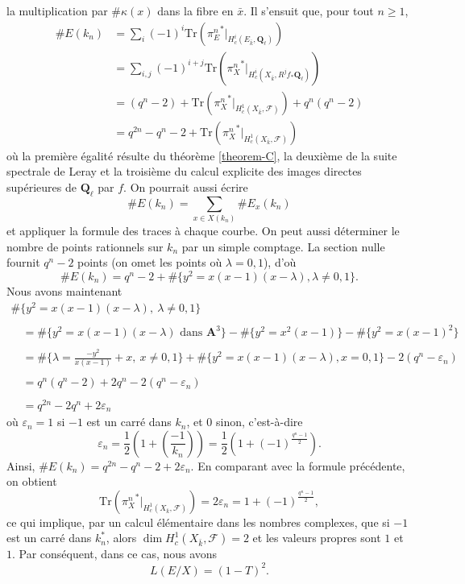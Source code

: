 la multiplication par $\#\kappa(x)$ dans la fibre en $\bar x$. Il s'ensuit que,
pour tout $n\geq 1$,
\begin{align*}
\# E(k_n)
& =
\sum\nolimits_i (-1)^i
\text{Tr}({\pi_E^n}^* |_{H_c^i(E_{\bar k}, \mathbf{Q}_\ell)}) \\
& =
\sum\nolimits_{i, j} (-1)^{i+j}
\text{Tr}({\pi^n_X}^* |_{H_c^i(X_{\bar k}, R^jf_*\mathbf{Q}_\ell)}) \\
& =
(q^n - 2) +
\text{Tr}({\pi_X^n}^* |_{H_c^1(X_{\bar k}, \mathcal{F})}) + q^n(q^n - 2) \\
& =
q^{2n} - q^n - 2 +
\text{Tr}({\pi_X^n}^* |_{H_c^1(X_{\bar k}, \mathcal{F})})
\end{align*}
où la première égalité résulte du
théorème \ref{theorem-C},
la deuxième de
la suite spectrale de Leray et la troisième du calcul explicite des images directes supérieures
de $\mathbf{Q}_\ell$ par $f$. On pourrait aussi écrire
$$
\# E(k_n) = \sum_{x \in X(k_n)} \# E_x(k_n)
$$
et appliquer la formule des traces à chaque courbe. On peut aussi déterminer le nombre de
points rationnels sur $k_n$ par un simple comptage. La section nulle fournit $q^n -2$ points
(on omet les points où $\lambda = 0, 1$), d'où
$$
\# E(k_n) =
q^n - 2 + \# \{y^2 = x(x - 1)(x - \lambda), \lambda\neq 0, 1\}.
$$
Nous avons maintenant
$$
\begin{matrix}
\# \{y^2 = x(x - 1)(x - \lambda),\ \lambda\neq 0, 1\} \\
\\
\quad =
\# \{y^2 = x(x - 1)(x - \lambda)\text{ dans }\mathbf{A}^3\}
- \# \{y^2 = x^2(x - 1)\} - \# \{y^2 = x(x - 1)^2\}\\
\\
\quad = \# \{\lambda = \frac{-y^2}{x(x - 1)} + x,\ x\neq 0, 1\} +
\# \{y^2 = x(x - 1)(x - \lambda), x = 0, 1\} - 2(q^n - \varepsilon_n) \\
\\
\quad = q^n(q^n - 2)+2q^n - 2(q^n - \varepsilon_n)\\
\\
\quad = q^{2n}-2q^n+2\varepsilon_n
\end{matrix}
$$
où $\varepsilon_n = 1$ si $-1$ est un carré dans $k_n$, et 0 sinon,
c'est-à-dire
$$
\varepsilon_n = \frac{1}{2}\left(1+\left(\frac{-1}{k_n}\right)\right) =
\frac{1}{2}\left(1+(-1)^{\frac{q^n - 1}{2}}\right).
$$
Ainsi, $ \# E(k_n) = q^{2n} - q^n - 2+ 2\varepsilon_n$.
En comparant avec la formule précédente, on obtient
$$
\text{Tr}({\pi_X^n}^* |_{H_c^1(X_{\bar k}, \mathcal{F})}) =
2 \varepsilon_n = 1 + (-1)^{\frac{q^n - 1}{2}},
$$
ce qui implique, par un calcul élémentaire dans les nombres complexes, que si $-1$ est un
carré dans $k_n^*$, alors $\dim H_c^1(X_{\bar k}, \mathcal{F}) = 2$ et les
valeurs propres sont $1$ et $1$. Par conséquent, dans ce cas, nous avons
$$
L(E/X) = (1 - T)^2.
$$




